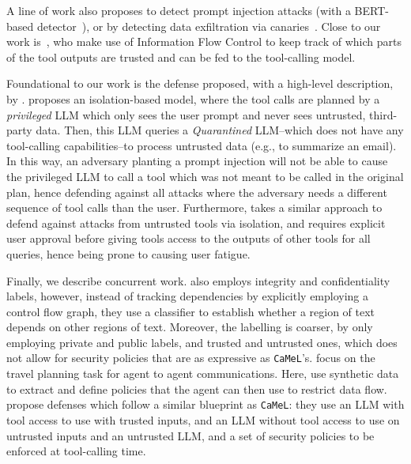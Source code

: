 \documentclass[11pt, a4paper, logo, copyright]{googledeepmind}
\newcommand{\sysname}{\texttt{CaMeL}\xspace}
\begin{document}
A line of work also proposes to detect prompt injection attacks (with a BERT-based detector~\citep{protectai2024deberta}), or by detecting data exfiltration via canaries~\citep{debenedetti2024dataset}. Close to our work is~\citet{wu2024system}, who make use of Information Flow Control to keep track of which parts of the tool outputs are trusted and can be fed to the tool-calling model.

Foundational to our work is the defense proposed, with a high-level description, by \citet{willison2023dualllm}. \citeauthor{willison2023dualllm} proposes an isolation-based model, where the tool calls are planned by a \textit{privileged} LLM which only sees the user prompt and never sees untrusted, third-party data. Then, this LLM queries a \textit{Quarantined} LLM--which does not have any tool-calling capabilities--to process untrusted data (e.g., to summarize an email). In this way, an adversary planting a prompt injection will not be able to cause the privileged LLM to call a tool which was not meant to be called in the original plan, hence defending against all attacks where the adversary needs a different sequence of tool calls than the user. Furthermore, \citet{wu2025isolategpt} takes a similar approach to defend against attacks from untrusted tools via isolation, and requires explicit user approval before giving tools access to the outputs of other tools for all queries, hence being prone to causing user fatigue.

Finally, we describe concurrent work. \citet{zhong2025rtbas} also employs integrity and confidentiality labels, however, instead of tracking dependencies by explicitly employing a control flow graph, they use a classifier to establish whether a region of text depends on other regions of text. Moreover, the labelling is coarser, by only employing private and public labels, and trusted and untrusted ones, which does not allow for security policies that are as expressive as \sysname's. \citet{abdelnabi2025firewalls} focus on the travel planning task for agent to agent communications. Here, \citeauthor{abdelnabi2025firewalls} use synthetic data to extract and define policies that the agent can then use to restrict data flow. \citet{kim2025prompt,li2025ace,costa2025securing} propose defenses which follow a similar blueprint as \sysname{}: they use an LLM with tool access to use with trusted inputs, and an LLM without tool access to use on untrusted inputs and an untrusted LLM, and a set of security policies to be enforced at tool-calling time.
\end{document}
